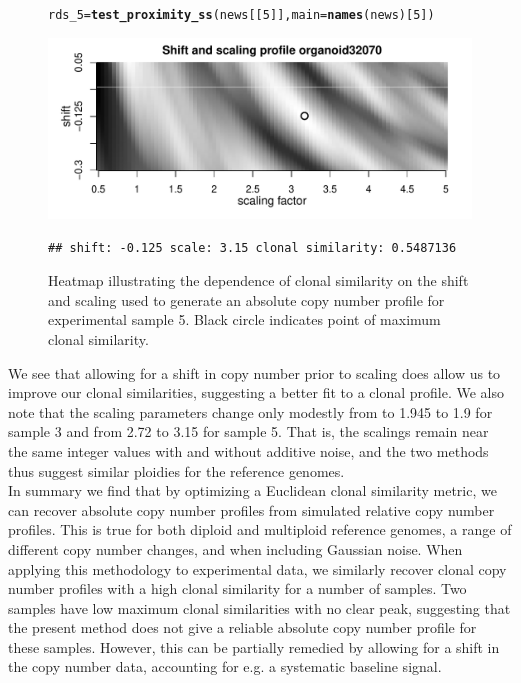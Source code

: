\documentclass[12pt]{article}\usepackage[]{graphicx}\usepackage[]{color}
\makeatletter
\newcommand{\hlnum}[1]{\textcolor[rgb]{0.686,0.059,0.569}{#1}}%
\newcommand{\hlstd}[1]{\textcolor[rgb]{0.345,0.345,0.345}{#1}}%
\newcommand{\hlkwb}[1]{\textcolor[rgb]{0.69,0.353,0.396}{#1}}%
\newcommand{\hlkwc}[1]{\textcolor[rgb]{0.333,0.667,0.333}{#1}}%
\newcommand{\hlkwd}[1]{\textcolor[rgb]{0.737,0.353,0.396}{\textbf{#1}}}%
\newenvironment{kframe}{%
 \def\at@end@of@kframe{}%
 \ifinner\ifhmode%
  \def\at@end@of@kframe{\end{minipage}}%
  \begin{minipage}{\columnwidth}%
 \fi\fi%
 \def\FrameCommand##1{\hskip\@totalleftmargin \hskip-\fboxsep
 \colorbox{shadecolor}{##1}\hskip-\fboxsep
     \hskip-\linewidth \hskip-\@totalleftmargin \hskip\columnwidth}%
 \MakeFramed {\advance\hsize-\width
   \@totalleftmargin\z@ \linewidth\hsize
   \@setminipage}}%
 {\par\unskip\endMakeFramed%
 \at@end@of@kframe}
\newenvironment{knitrout}{}{} %
\makeatother
\begin{document}
\begin{figure}[h!]
  \centering
\begin{knitrout}
\color{fgcolor}\begin{kframe}
\begin{alltt}
\hlstd{rds_5} \hlkwb{=} \hlkwd{test_proximity_ss}\hlstd{(news[[}\hlnum{5}\hlstd{]],} \hlkwc{main} \hlstd{=} \hlkwd{names}\hlstd{(news)[}\hlnum{5}\hlstd{])}
\end{alltt}
\end{kframe}
\includegraphics[width=.95\linewidth]{figure/unnamed-chunk-21-1} 
\begin{kframe}\begin{verbatim}
## shift: -0.125 scale: 3.15 clonal similarity: 0.5487136
\end{verbatim}
\end{kframe}
\end{knitrout}
\caption{Heatmap illustrating the dependence of clonal similarity on the shift and scaling used to generate an absolute copy number profile for experimental sample 5. Black circle indicates point of maximum clonal similarity.}
\label{fig:samp5_shift}
\end{figure}

We see that allowing for a shift in copy number prior to scaling does allow us to improve our clonal similarities, suggesting a better fit to a clonal profile. We also note that the scaling parameters change only modestly from to 1.945 to 1.9 for sample 3 and from 2.72 to 3.15 for sample 5. That is, the scalings remain near the same integer values with and without additive noise, and the two methods thus suggest similar ploidies for the reference genomes.\\

In summary we find that by optimizing a Euclidean clonal similarity metric, we can recover absolute copy number profiles from simulated relative copy number profiles. This is true for both diploid and multiploid reference genomes, a range of different copy number changes, and when including Gaussian noise. When applying this methodology to experimental data, we similarly recover clonal copy number profiles with a high clonal similarity for a number of samples. Two samples have low maximum clonal similarities with no clear peak, suggesting that the present method does not give a reliable absolute copy number profile for these samples. However, this can be partially remedied by allowing for a shift in the copy number data, accounting for e.g. a systematic baseline signal.
\end{document}
